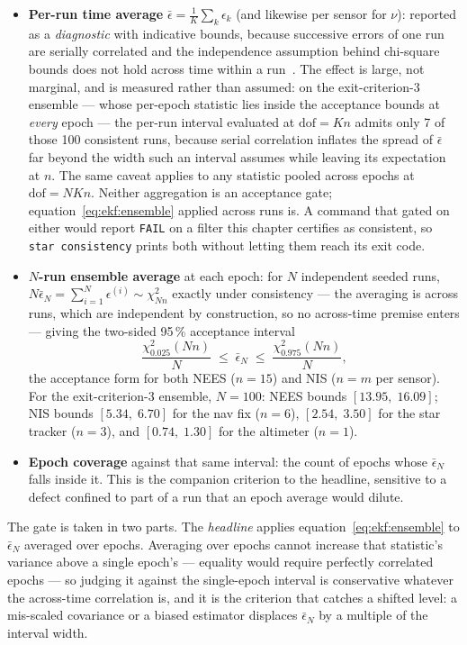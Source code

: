 \begin{itemize}
  \item \textbf{Per-run time average} $\bar\epsilon = \tfrac1K
    \sum_k \epsilon_k$ (and likewise per sensor for $\nu$): reported as
    a \emph{diagnostic} with indicative bounds, because successive
    errors of one run are serially correlated and the independence
    assumption behind chi-square bounds does not hold across time
    within a run~\cite{barshalom2001}. The effect is large, not
    marginal, and is measured rather than assumed: on the
    exit-criterion-3 ensemble --- whose per-epoch statistic lies inside
    the acceptance bounds at \emph{every} epoch --- the per-run interval
    evaluated at $\mathrm{dof} = K n$ admits only 7 of those 100
    consistent runs, because serial correlation inflates the
    spread of $\bar\epsilon$ far beyond the width such an interval
    assumes while leaving its expectation at $n$. The same caveat
    applies to any statistic pooled across epochs at
    $\mathrm{dof} = N K n$. Neither aggregation is an acceptance gate;
    equation~\eqref{eq:ekf:ensemble} applied across runs is. A command
    that gated on either would report \texttt{FAIL} on a filter this
    chapter certifies as consistent, so \texttt{star consistency}
    prints both without letting them reach its exit code.
  \item \textbf{$N$-run ensemble average} at each epoch: for $N$
    independent seeded runs, $N\bar\epsilon_N =
    \sum_{i=1}^{N}\epsilon^{(i)} \sim \chi^2_{Nn}$ exactly under
    consistency --- the averaging is across runs, which are independent
    by construction, so no across-time premise enters --- giving the
    two-sided 95\,\% acceptance interval
    \begin{equation}
      \boxed{\;
      \frac{\chi^2_{0.025}(Nn)}{N}
        \;\le\; \bar\epsilon_N \;\le\;
      \frac{\chi^2_{0.975}(Nn)}{N},
      \;}
      \label{eq:ekf:ensemble}
    \end{equation}
    the acceptance form for both NEES ($n = 15$) and NIS ($n = m$ per
    sensor). For the exit-criterion-3 ensemble, $N = 100$: NEES bounds
    $[13.95,\; 16.09]$; NIS bounds $[5.34,\; 6.70]$ for the nav fix
    ($n = 6$), $[2.54,\; 3.50]$ for the star tracker ($n = 3$), and
    $[0.74,\; 1.30]$ for the altimeter ($n = 1$).
  \item \textbf{Epoch coverage} against that same interval: the count
    of epochs whose $\bar\epsilon_N$ falls inside it. This is the
    companion criterion to the headline, sensitive to a defect confined
    to part of a run that an epoch average would dilute.
\end{itemize}
The gate is taken in two parts. The \emph{headline} applies
equation~\eqref{eq:ekf:ensemble} to $\bar\epsilon_N$ averaged over
epochs. Averaging over epochs cannot increase that statistic's variance
above a single epoch's --- equality would require perfectly correlated
epochs --- so judging it against the single-epoch interval is
conservative whatever the across-time correlation is, and it is the
criterion that catches a shifted level: a mis-scaled covariance or a
biased estimator displaces $\bar\epsilon_N$ by a multiple of the
interval width.

